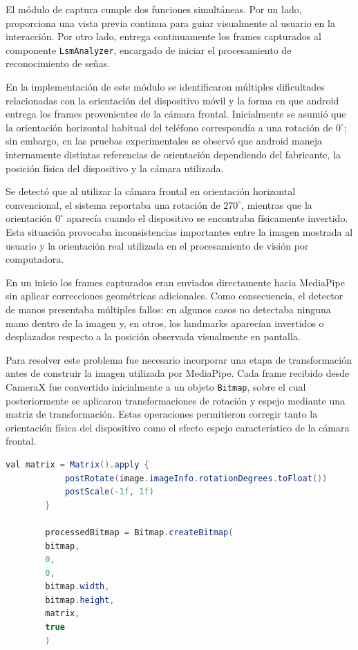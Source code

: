 	El módulo de captura cumple dos funciones simultáneas. Por un lado, proporciona una vista previa continua para guiar visualmente al usuario en la interacción. Por otro lado, entrega continuamente los frames capturados al componente \texttt{LsmAnalyzer}, encargado de iniciar el procesamiento de reconocimiento de señas.
	
	En la implementación de este módulo se identificaron múltiples dificultades relacionadas con la orientación del dispositivo móvil y la forma en que android entrega los frames provenientes de la cámara frontal. Inicialmente se asumió que la orientación horizontal habitual del teléfono correspondía a una rotación de \(0^\circ\); sin embargo, en las pruebas experimentales se observó que android maneja internamente distintas referencias de orientación dependiendo del fabricante, la posición física del dispositivo y la cámara utilizada.
	
	Se detectó que al utilizar la cámara frontal en orientación horizontal convencional, el sistema reportaba una rotación de \(270^\circ\), mientras que la orientación \(0^\circ\) aparecía cuando el dispositivo se encontraba físicamente invertido. Esta situación provocaba inconsistencias importantes entre la imagen mostrada al usuario y la orientación real utilizada en el procesamiento de visión por computadora.
	
	En un inicio los frames capturados eran enviados directamente hacia MediaPipe sin aplicar correcciones geométricas adicionales. Como consecuencia, el detector de manos presentaba múltiples fallos: en algunos casos no detectaba ninguna mano dentro de la imagen y, en otros, los landmarks aparecían invertidos o desplazados respecto a la posición observada visualmente en pantalla.
	
	Para resolver este problema fue necesario incorporar una etapa de transformación antes de construir la imagen utilizada por MediaPipe. Cada frame recibido desde CameraX fue convertido inicialmente a un objeto \texttt{Bitmap}, sobre el cual posteriormente se aplicaron transformaciones de rotación y espejo mediante una matriz de transformación. Estas operaciones permitieron corregir tanto la orientación física del dispositivo como el efecto espejo característico de la cámara frontal.
	
	\begin{lstlisting}[language=Java, caption={Corrección de orientación y efecto espejo antes de MediaPipe.}, label={lst:rotation_fix}]
		val matrix = Matrix().apply {
			postRotate(image.imageInfo.rotationDegrees.toFloat())
			postScale(-1f, 1f)
		}
		
		processedBitmap = Bitmap.createBitmap(
		bitmap,
		0,
		0,
		bitmap.width,
		bitmap.height,
		matrix,
		true
		)
	\end{lstlisting}
	
